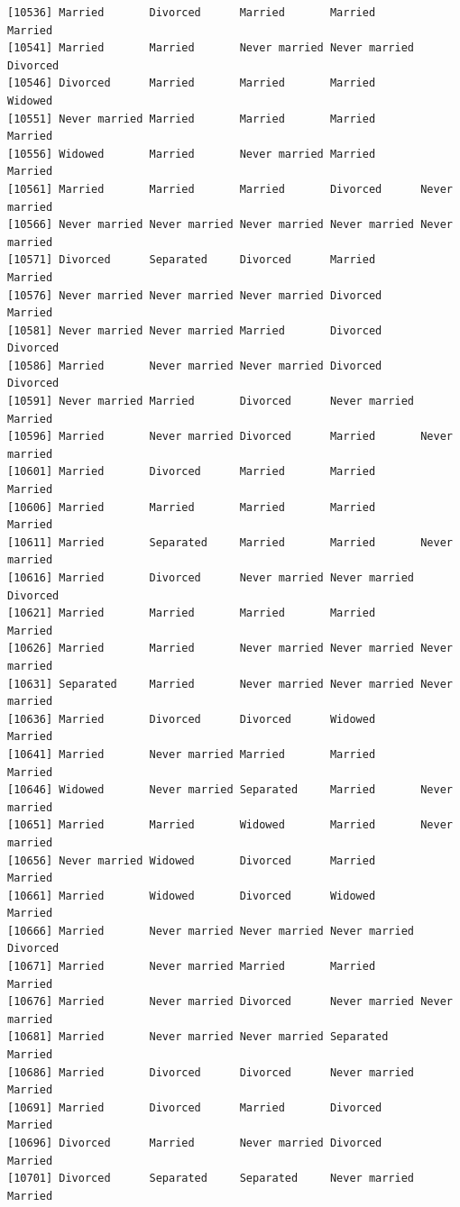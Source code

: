 \documentclass[
  letterpaper,
  DIV=11,
  numbers=noendperiod,
  oneside]{scrartcl}
\begin{document}
\begin{verbatim}
[10536] Married       Divorced      Married       Married       Married      
[10541] Married       Married       Never married Never married Divorced     
[10546] Divorced      Married       Married       Married       Widowed      
[10551] Never married Married       Married       Married       Married      
[10556] Widowed       Married       Never married Married       Married      
[10561] Married       Married       Married       Divorced      Never married
[10566] Never married Never married Never married Never married Never married
[10571] Divorced      Separated     Divorced      Married       Married      
[10576] Never married Never married Never married Divorced      Married      
[10581] Never married Never married Married       Divorced      Divorced     
[10586] Married       Never married Never married Divorced      Divorced     
[10591] Never married Married       Divorced      Never married Married      
[10596] Married       Never married Divorced      Married       Never married
[10601] Married       Divorced      Married       Married       Married      
[10606] Married       Married       Married       Married       Married      
[10611] Married       Separated     Married       Married       Never married
[10616] Married       Divorced      Never married Never married Divorced     
[10621] Married       Married       Married       Married       Married      
[10626] Married       Married       Never married Never married Never married
[10631] Separated     Married       Never married Never married Never married
[10636] Married       Divorced      Divorced      Widowed       Married      
[10641] Married       Never married Married       Married       Married      
[10646] Widowed       Never married Separated     Married       Never married
[10651] Married       Married       Widowed       Married       Never married
[10656] Never married Widowed       Divorced      Married       Married      
[10661] Married       Widowed       Divorced      Widowed       Married      
[10666] Married       Never married Never married Never married Divorced     
[10671] Married       Never married Married       Married       Married      
[10676] Married       Never married Divorced      Never married Never married
[10681] Married       Never married Never married Separated     Married      
[10686] Married       Divorced      Divorced      Never married Married      
[10691] Married       Divorced      Married       Divorced      Married      
[10696] Divorced      Married       Never married Divorced      Married      
[10701] Divorced      Separated     Separated     Never married Married      

\end{verbatim}
\end{document}
